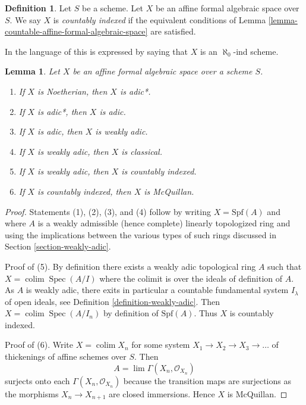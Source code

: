 \documentclass{stacks-project}
\theoremstyle{plain}
\newtheorem{lemma}[subsection]{Lemma}
\theoremstyle{definition}
\newtheorem{definition}[subsection]{Definition}
\theoremstyle{remark}
\numberwithin{equation}{subsection}
\def\lim{\mathop{\mathrm{lim}}\nolimits}
\def\colim{\mathop{\mathrm{colim}}\nolimits}
\def\Spec{\mathop{\mathrm{Spec}}}
\begin{document}
\begin{definition}
\label{definition-countable}
Let $S$ be a scheme. Let $X$ be an affine formal algebraic space over $S$.
We say $X$ is {\it countably indexed} if the equivalent conditions of
Lemma \ref{lemma-countable-affine-formal-algebraic-space} are satisfied.
\end{definition}

\noindent
In the language of \cite{BVGD} this is expressed by saying that
$X$ is an $\aleph_0$-ind scheme.

\begin{lemma}
\label{lemma-implications-between-types}
Let $X$ be an affine formal algebraic space over a scheme $S$.
\begin{enumerate}
\item If $X$ is Noetherian, then $X$ is adic*.
\item If $X$ is adic*, then $X$ is adic.
\item If $X$ is adic, then $X$ is weakly adic.
\item If $X$ is weakly adic, then $X$ is classical.
\item If $X$ is weakly adic, then $X$ is countably indexed.
\item If $X$ is countably indexed, then $X$ is McQuillan.
\end{enumerate}
\end{lemma}

\begin{proof}
Statements (1), (2), (3), and (4) follow by writing $X = \text{Spf}(A)$
and where $A$ is a weakly admissible (hence complete) linearly
topologized ring and using the implications between the various
types of such rings discussed in Section \ref{section-weakly-adic}.

\medskip\noindent
Proof of (5). By definition there exists a weakly adic topological ring $A$
such that $X = \colim \Spec(A/I)$ where the colimit is over the ideals
of definition of $A$. As $A$ is weakly adic, there exits in particular
a countable fundamental system $I_\lambda$ of open ideals, see
Definition \ref{definition-weakly-adic}.
Then $X = \colim \Spec(A/I_n)$ by definition of $\text{Spf}(A)$.
Thus $X$ is countably indexed.

\medskip\noindent
Proof of (6). Write $X = \colim X_n$ for some system
$X_1 \to X_2 \to X_3 \to \ldots$ of thickenings of affine
schemes over $S$. Then
$$
A = \lim \Gamma(X_n, \mathcal{O}_{X_n})
$$
surjects onto each $\Gamma(X_n, \mathcal{O}_{X_n})$ because the transition
maps are surjections as the morphisms $X_n \to X_{n + 1}$ are closed
immersions. Hence $X$ is McQuillan.
\end{proof}
\end{document}
